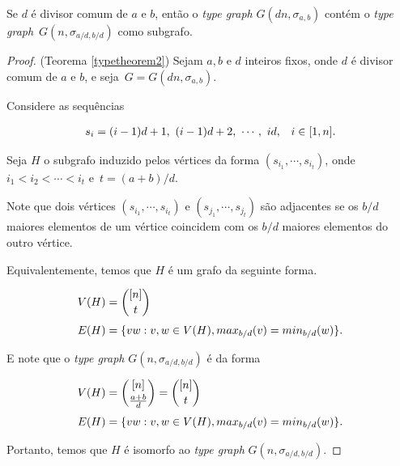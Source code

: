\begin{teorema}\label{typetheorem2}
Se $d$ é divisor comum de $a$ e $b$, então o \textit{type graph} $G(dn,\sigma_{a,b})$ contém o \textit{type graph}~$G(n,\sigma_{a/d,b/d})$ como subgrafo.
\end{teorema}

\begin{proof}(Teorema \ref{typetheorem2})
Sejam $a,b$ e $d$ inteiros fixos, onde $d$ é divisor comum de $a$ e $b$, e seja~$G = G(dn,\sigma_{a,b})$.

Considere as sequências

\begin{equation*}
\setlength{\jot}{6pt}
\begin{aligned}
s_i &= (i-1)d+1,\ (i-1)d+2,\ \cdots,\ id, & i\in [1,n].
\end{aligned}
\end{equation*}

Seja $H$ o subgrafo induzido pelos vértices da forma $(s_{i_1}, \cdots, s_{i_t})$, onde $i_1 < i_2 < \cdots < i_t$ e~$t = (a+b)/d$.

Note que dois vértices $(s_{i_1}, \cdots, s_{i_t})$ e $(s_{j_1}, \cdots, s_{j_t})$ são adjacentes se os $b/d$ maiores elementos de um vértice coincidem com os $b/d$ maiores elementos do outro vértice.


Equivalentemente, temos que $H$ é um grafo da seguinte forma.

\begin{equation*}
\setlength{\jot}{6pt}
\begin{aligned}
V(H) &= \binom{[n]}{t}\\
E(H) &= \{vw : v,w\in V(H), max_{b/d}(v) = min_{b/d}(w)\}.
\end{aligned}
\end{equation*}

E note que o \textit{type graph} $G(n,\sigma_{a/d,b/d})$ é da forma

\begin{equation*}
\setlength{\jot}{6pt}
\begin{aligned}
V(H) &= \binom{[n]}{\frac{a+b}{d}} = \binom{[n]}{t}\\
E(H) &= \{vw : v,w\in V(H), max_{b/d}(v) = min_{b/d}(w)\}.
\end{aligned}
\end{equation*}

Portanto, temos que $H$ é isomorfo ao \textit{type graph} $G(n,\sigma_{a/d,b/d})$.
\end{proof}


